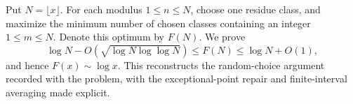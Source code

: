 Put $N=\lfloor x\rfloor$. For each modulus $1\le n\le N$, choose one residue class, and maximize the minimum number of chosen classes containing an integer $1\le m\le N$. Denote this optimum by $F(N)$. We prove
\[
 \log N-O(\sqrt{\log N\log\log N})\le F(N)\le\log N+O(1),
\]
and hence $F(x)\sim\log x$. This reconstructs the random-choice argument recorded with the problem, with the exceptional-point repair and finite-interval averaging made explicit.
